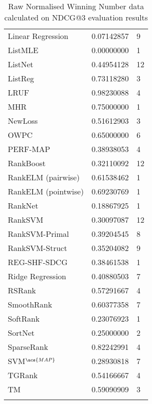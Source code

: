 \begin{longtable}{l|l|l}
Linear Regression & 0.07142857 & 9 \\ 
List\acs{MLE} & 0.00000000 & 1 \\ 
ListNet & 0.44954128 & 12 \\ 
ListReg & 0.73118280 & 3 \\ 
LRUF & 0.98230088 & 4 \\ 
MHR & 0.75000000 & 1 \\ 
NewLoss & 0.51612903 & 3 \\ 
OWPC & 0.65000000 & 6 \\ 
PERF-\acs{MAP} & 0.38938053 & 4 \\ 
RankBoost & 0.32110092 & 12 \\ 
RankELM (pairwise) & 0.61538462 & 1 \\ 
RankELM (pointwise) & 0.69230769 & 1 \\ 
RankNet & 0.18867925 & 1 \\ 
Rank\acs{SVM} & 0.30097087 & 12 \\ 
Rank\acs{SVM}-Primal & 0.39204545 & 8 \\ 
Rank\acs{SVM}-Struct & 0.35204082 & 9 \\ 
REG-SHF-SDCG & 0.38461538 & 1 \\ 
Ridge Regression & 0.40880503 & 7 \\ 
RSRank & 0.57291667 & 4 \\ 
SmoothRank & 0.60377358 & 7 \\ 
SoftRank & 0.23076923 & 1 \\ 
SortNet & 0.25000000 & 2 \\ 
SparseRank & 0.82242991 & 4 \\ 
\acs{SVM}$^{\acs{MAP}}$ & 0.28930818 & 7 \\ 
TGRank & 0.54166667 & 4 \\ 
TM & 0.59090909 & 3 \\
\caption{Raw Normalised Winning Number data calculated on \acs{NDCG}@3 evaluation results}
\label{tab:raw_data_norm_winnum_ndcg3}
\end{longtable}